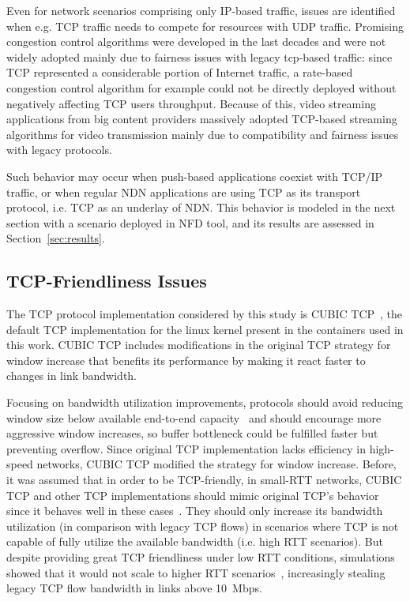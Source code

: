 \documentclass[11pt,conference]{./IEEEtran}
\begin{document}
	Even for network scenarios comprising only IP-based traffic, issues are identified when e.g. TCP traffic needs to compete for resources with UDP traffic. Promising congestion control algorithms were developed in the last decades and were not widely adopted mainly due to fairness issues with legacy tcp-based traffic: since TCP represented a considerable portion of Internet traffic, a rate-based congestion control algorithm for example could not be directly deployed without negatively affecting TCP users throughput. Because of this, video streaming applications from big content providers massively adopted TCP-based streaming algorithms for video transmission mainly due to compatibility and fairness issues with legacy protocols.

	Such behavior may occur when push-based applications coexist with TCP/IP traffic, or when regular NDN applications are using TCP as its transport protocol, i.e. TCP as an underlay of NDN. This behavior is modeled in the next section with a scenario deployed in NFD tool, and its results are assessed in Section~\ref{sec:results}.

	\subsection{TCP-Friendliness Issues}

	The TCP protocol implementation considered by this study is CUBIC TCP~\cite{cubictcp}, the default TCP implementation for the linux kernel present in the containers used in this work. CUBIC TCP includes 
	modifications in the original TCP strategy for window increase that benefits its performance by making it react faster to changes in link bandwidth.  

	Focusing on bandwidth utilization improvements, protocols should avoid reducing window size below available end-to-end capacity~\cite{Kliazovich08} and should encourage more aggressive window increases, so buffer bottleneck could be fulfilled faster but preventing overflow. Since original TCP implementation lacks efficiency in high-speed networks, CUBIC TCP modified the strategy for window increase. Before, it was assumed that in order to be TCP-friendly, in small-RTT networks, CUBIC TCP and other TCP implementations should mimic original TCP’s behavior since it behaves well in these cases~\cite{Floyd03}. They should only increase its bandwidth utilization (in comparison with legacy TCP flows) in scenarios where TCP is not capable of fully utilize the available bandwidth (i.e. high RTT scenarios). But despite providing great TCP friendliness under low RTT conditions, simulations showed that it would not scale to higher RTT scenarios~\cite{cubictcp}, increasingly stealing legacy TCP flow bandwidth in links above 10~Mbps. 
\end{document}
